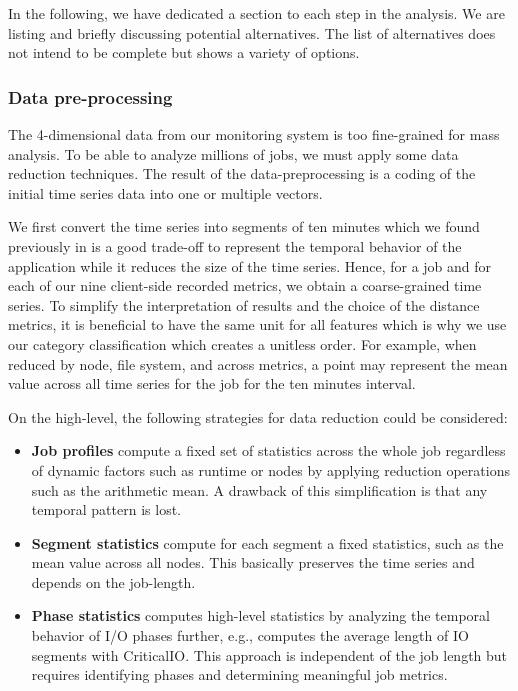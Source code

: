 \documentclass{jhps}
\begin{document}
In the following, we have dedicated a section to each step in the analysis.
We are listing and briefly discussing potential alternatives.
The list of alternatives does not intend to be complete but shows a variety of options.

\subsubsection{Data pre-processing}
The 4-dimensional data from our monitoring system is too fine-grained for mass analysis.
To be able to analyze millions of jobs, we must apply some data reduction techniques.
The result of the data-preprocessing is a coding of the initial time series data into one or multiple vectors.

We first convert the time series into segments of ten minutes which we found previously in \cite{iocats2020} is a good trade-off to represent the temporal behavior of the application while it reduces the size of the time series.
Hence, for a job and for each of our nine client-side recorded metrics, we obtain a coarse-grained time series.
To simplify the interpretation of results and the choice of the distance metrics, it is beneficial to have the same unit for all features which is why we use our category classification which creates a unitless order.
For example, when reduced by node, file system, and across metrics, a point may represent the mean value across all time series for the job for the ten minutes interval.

On the high-level, the following strategies for data reduction could be considered:
\begin{itemize}
	\item \textbf{Job profiles} compute a fixed set of statistics across the whole job regardless of dynamic factors such as runtime or nodes by applying reduction operations such as the arithmetic mean.
		A drawback of this simplification is that any temporal pattern is lost.
	\item \textbf{Segment statistics} compute for each segment a fixed statistics, such as the mean value across all nodes.
		This basically preserves the time series and depends on the job-length.
	\item \textbf{Phase statistics} computes high-level statistics by analyzing the temporal behavior of I/O phases further, e.g., computes the average length of IO segments with CriticalIO.
		This approach is independent of the job length but requires identifying phases and determining meaningful job metrics.
\end{itemize}
\end{document}
